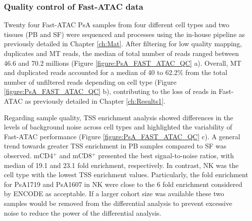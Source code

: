 \subsubsection{Quality control of Fast-ATAC data}
Twenty four Fast-ATAC PsA samples from four different cell types and two tissues (PB and SF) were sequenced and processes using the in-house pipeline as previously detailed in Chapter \ref{ch:Mat}. After filtering for low quality mapping, duplicates and MT reads, the median of total number of reads ranged between 46.6 and 70.2 millions (Figure \ref{figure:PsA_FAST_ATAC_QC} a). Overall, MT and duplicated reads accounted for a median of 40 to 62.2\% from the total number of unfiltered reads depending on cell type (Figure \ref{figure:PsA_FAST_ATAC_QC} b), contributing to the loss of reads in Fast-ATAC as previously detailed in Chapter \ref{ch:Results1}. %

Regarding sample quality, TSS enrichment analysis showed differences in the levels of background noise across cell types and highlighted the variability of Fast-ATAC performance (Figure \ref{figure:PsA_FAST_ATAC_QC} c). A general trend towards greater TSS enrichment in PB samples compared to SF was observed. mCD4$^+$ and mCD8$^+$ presented the best signal-to-noise ratios, with median of 19.1 and 23.1 fold enrichment, respectively. In contrast, NK was the cell type with the lowest TSS enrichment values. Particularly, the fold enrichment for PsA1719 and PsA1607 in NK were close to the 6 fold enrichment considered by ENCODE as acceptable. If a larger cohort size was available these two samples would be removed from the differential analysis to prevent excessive noise to reduce the power of the differential analysis. 

